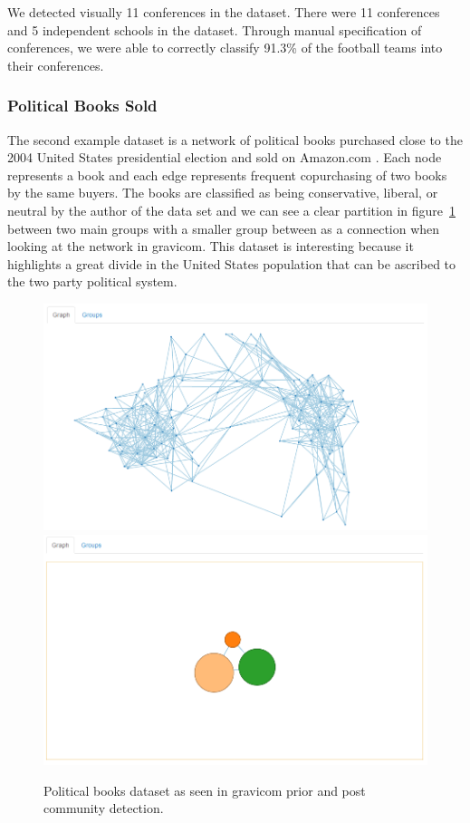 \documentclass{article}\usepackage[]{graphicx}\usepackage[]{color}
\begin{document}
We detected visually 11 conferences in the dataset. There were 11 conferences and 5 independent schools in the dataset. Through manual specification of conferences, we were able to correctly classify 91.3\% of the football teams into their conferences.

\subsubsection{Political Books Sold}
The second example dataset is a network of political books purchased close to the 2004 United States presidential election and sold on Amazon.com \cite{polbooks}. Each node represents a book and each edge represents frequent copurchasing of two books by the same buyers. The books are classified as being conservative, liberal, or neutral by the author of the data set and we can see a clear partition in figure~\ref{fig:polbooks_1} between two main groups with a smaller group between as a connection when looking at the network in gravicom. This dataset is interesting because it highlights a great divide in the United States population that can be ascribed to the two party political system. 

\begin{figure}[H]
\centering
\includegraphics[width=\textwidth]{images/polbooks_1.png}
\includegraphics[width=\textwidth]{images/polbooks_2.png}
\caption{\label{fig:polbooks_1} Political books dataset as seen in gravicom prior and post community detection.}
\end{figure}
\end{document}
